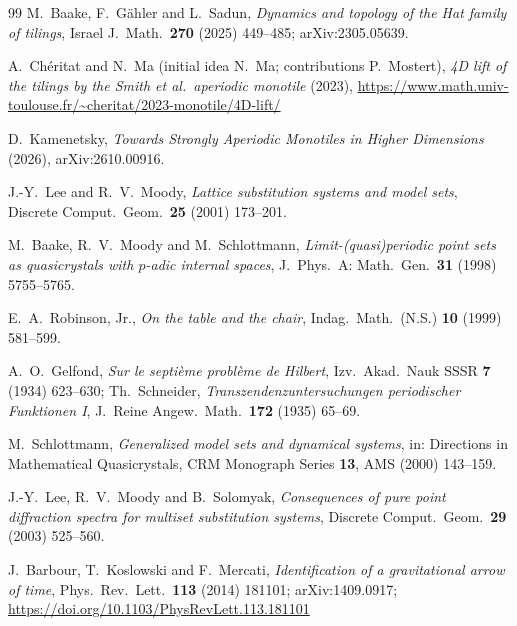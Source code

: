 \documentclass[11pt]{article}
\theoremstyle{definition}
\theoremstyle{remark}
\begin{document}
\begin{thebibliography}{99}
 M.~Baake, F.~G\"ahler and L.~Sadun, \emph{Dynamics and topology of the Hat family of tilings}, Israel J.\ Math.\
\textbf{270} (2025) 449--485; arXiv:2305.05639.

 A.~Ch\'eritat and N.~Ma (initial idea N.~Ma; contributions P.~Mostert),
\emph{4D lift of the tilings by the Smith et al.\ aperiodic monotile} (2023),
\url{https://www.math.univ-toulouse.fr/~cheritat/2023-monotile/4D-lift/}



 D.~Kamenetsky, \emph{Towards Strongly Aperiodic Monotiles in Higher Dimensions} (2026), arXiv:2610.00916.

 J.-Y.~Lee and R.~V.~Moody, \emph{Lattice substitution systems and model
sets}, Discrete Comput.\ Geom.\ \textbf{25} (2001) 173--201.

 M.~Baake, R.~V.~Moody and M.~Schlottmann, \emph{Limit-(quasi)periodic point sets as quasicrystals with
$p$-adic internal spaces}, J.\ Phys.\ A: Math.\ Gen.\ \textbf{31} (1998) 5755--5765.

 E.~A.~Robinson, Jr., \emph{On the table and the chair}, Indag.\ Math.\ (N.S.) \textbf{10} (1999) 581--599.

 A.~O.~Gelfond, \emph{Sur le septi\`eme probl\`eme de Hilbert}, Izv.\ Akad.\ Nauk SSSR \textbf{7} (1934) 623--630;
Th.~Schneider, \emph{Transzendenzuntersuchungen periodischer Funktionen I}, J.\ Reine Angew.\ Math.\ \textbf{172} (1935) 65--69.

 M.~Schlottmann, \emph{Generalized model sets and dynamical systems},
in: Directions in Mathematical Quasicrystals, CRM Monograph Series \textbf{13}, AMS (2000) 143--159.

 J.-Y.~Lee, R.~V.~Moody and B.~Solomyak, \emph{Consequences of pure point
diffraction spectra for multiset substitution systems}, Discrete Comput.\ Geom.\ \textbf{29} (2003) 525--560.

 J.~Barbour, T.~Koslowski and F.~Mercati, \emph{Identification of a gravitational arrow of time},
Phys.\ Rev.\ Lett.\ \textbf{113} (2014) 181101; arXiv:1409.0917;
\url{https://doi.org/10.1103/PhysRevLett.113.181101}

\end{thebibliography}
\end{document}
